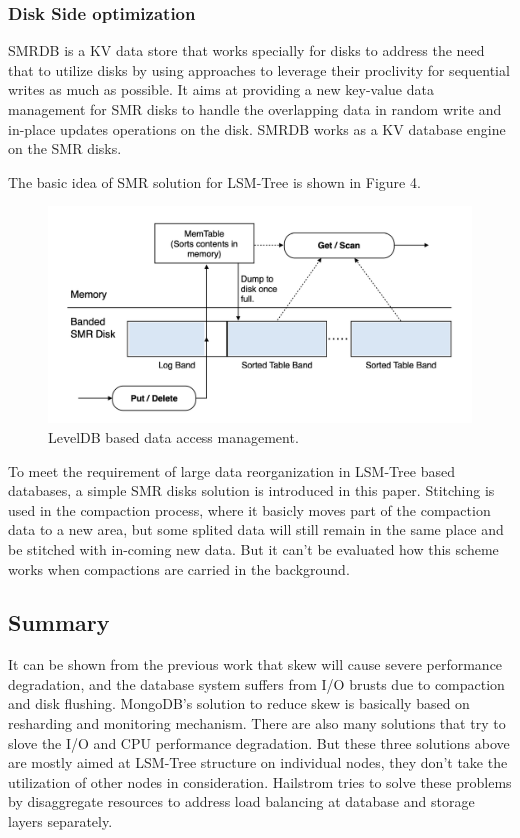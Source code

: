 \documentclass[a4paper,10pt,twoside]{article}
\begin{document}
\subsubsection{Disk Side optimization}
SMRDB \cite{SMRDB} is a KV data store that works specially for disks to address the need that to utilize disks by using approaches to leverage their proclivity for sequential writes as much as possible.
It aims at providing a new key-value data management for SMR disks to handle the overlapping data in random write and in-place updates operations on the disk.
SMRDB works as a KV database engine on the SMR disks. 
\par
The basic idea of SMR solution for LSM-Tree is shown in Figure 4.
\begin{figure}[h]
    \centering
	\includegraphics[scale=0.3]{SMR.png}
    \caption{ LevelDB based data access management.}
    \label{fig:mesh1}
\end{figure}
To meet the requirement of large data reorganization in LSM-Tree based databases, a simple SMR disks solution is introduced in this paper.
Stitching is used in the compaction process, where it basicly moves part of the compaction data to a new area, 
but some splited data will still remain in the same place and be stitched with in-coming new data.
But it can't be evaluated how this scheme works when compactions are carried in the background.

\subsection{Summary}
It can be shown from the previous work that skew will cause severe performance degradation, and the database system suffers from I/O brusts due to compaction and disk flushing.
MongoDB's solution to reduce skew is basically based on resharding and monitoring mechanism.
There are also many solutions that try to slove the I/O and CPU performance degradation.
But these three solutions above are mostly aimed at LSM-Tree structure on individual nodes, they don't take the utilization of other nodes in consideration.
Hailstrom tries to solve these problems by disaggregate resources to address load balancing at database and storage layers separately.
\end{document}
